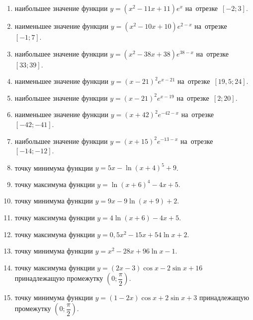 \documentclass[a4paper,10pt]{article}
\begin{document}
\begin{enumerate}
\item {} наибольшее значение функции $y=\left(x^2 -11x +11\right)e^{x}$ на~отрезке~$\left[-2;3\right]$.

\item {} наименьшее значение функции $y=\left(x^2 -10x +10\right)e^{2-x}$ на~отрезке~$\left[-1;7\right]$.

\item {} наибольшее значение функции $y=\left(x^2 -38x +38\right)e^{38-x}$ на~отрезке~$\left[33;39\right]$.

\item {} наименьшее значение функции $y=\left(x-21\right)^2e^{x-21}$ на~отрезке~$\left[19,5;24\right]$.

\item {} наибольшее значение функции $y=\left(x-21\right)^2e^{x-19}$ на~отрезке~$\left[2;20\right]$.

\item {} наименьшее значение функции $y=\left(x+42\right)^2e^{-42-x}$ на~отрезке~$\left[-42;-41\right]$.

\item {} наибольшее значение функции $y=\left(x+15\right)^2e^{-13-x}$ на~отрезке~$\left[-14;-12\right]$.

\item {} точку минимума функции $y=5x-\ln\left(x+4\right)^{5}+9$.

\item {} точку максимума функции $y=\ln\left(x+6\right)^{4}-4x+5$.

\item {} точку минимума функции $y=9x-9\ln\left(x+9\right)+2$.

\item {} точку максимума функции $y=4\ln\left(x+6\right)-4x+5$.

\item {} точку максимума функции $y=0,5x^2-15x+54\ln x +2$.

\item {} точку минимума функции $y=x^2-28x+96\ln x -1$.

\item {} точку максимума функции $y=\left(2x-3\right)\cos x -2\sin x+16$
принадлежащую промежутку $\left(0;\dfrac{\pi}{2}\right)$.

\item {} точку минимума функции $y=\left(1-2x\right)\cos x +2\sin x+3$
принадлежащую промежутку $\left(0;\dfrac{\pi}{2}\right)$.


\end{enumerate}
\end{document}
